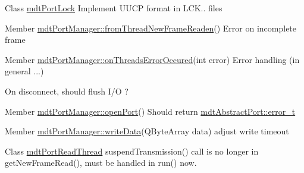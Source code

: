 \label{todo__todo000009}
\hypertarget{todo__todo000009}{}
 
\begin{DoxyDescription}
\item[Class \hyperlink{classmdt_port_lock}{mdtPortLock} ]Implement UUCP format in LCK.. files 
\end{DoxyDescription}

\label{todo__todo000023}
\hypertarget{todo__todo000023}{}
 
\begin{DoxyDescription}
\item[Member \hyperlink{classmdt_port_manager_a4fcc8f0699b655156e661bb3de6056cc}{mdtPortManager::fromThreadNewFrameReaden}() ]Error on incomplete frame 
\end{DoxyDescription}

\label{todo__todo000024}
\hypertarget{todo__todo000024}{}
 
\begin{DoxyDescription}
\item[Member \hyperlink{classmdt_port_manager_a7e45b8e3475e5182ed12218616664d07}{mdtPortManager::onThreadsErrorOccured}(int error) ]Error handling (in general ...) 

On disconnect, should flush I/O ? 
\end{DoxyDescription}

\label{todo__todo000025}
\hypertarget{todo__todo000025}{}
 
\begin{DoxyDescription}
\item[Member \hyperlink{classmdt_port_manager_aab594613e8985590c835194efbc27b5e}{mdtPortManager::openPort}() ]Should return \hyperlink{classmdt_abstract_port_ad4121bb930c95887e77f8bafa065a85e}{mdtAbstractPort::error\_\-t} 
\end{DoxyDescription}

\label{todo__todo000026}
\hypertarget{todo__todo000026}{}
 
\begin{DoxyDescription}
\item[Member \hyperlink{classmdt_port_manager_a8b60d53d6e553f15dedec916f9c1614b}{mdtPortManager::writeData}(QByteArray data) ]adjust write timeout 
\end{DoxyDescription}

\label{todo__todo000027}
\hypertarget{todo__todo000027}{}
 
\begin{DoxyDescription}
\item[Class \hyperlink{classmdt_port_read_thread}{mdtPortReadThread} ]suspendTransmission() call is no longer in getNewFrameRead(), must be handled in run() now. 
\end{DoxyDescription}

